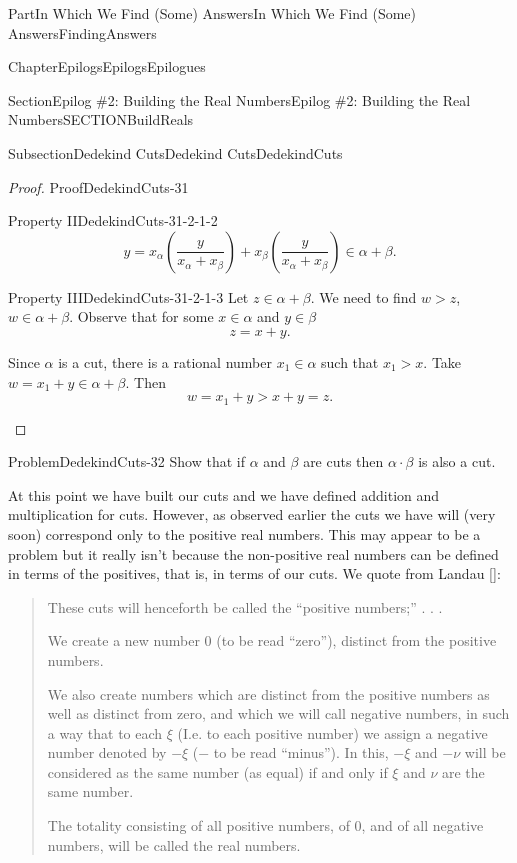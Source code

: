 \documentclass[oneside,10pt,]{book}
\newcommand{\xreffont}{\relax}
\numberwithin{equation}{part}
\begin{document}
\begin{partptx}{Part}{In Which We Find (Some) Answers}{}{In Which We Find (Some) Answers}{}{}{FindingAnswers}
\begin{chapterptx}{Chapter}{Epilogs}{}{Epilogs}{}{}{Epilogues}
\begin{sectionptx}{Section}{Epilog \#2: Building the Real Numbers}{}{Epilog \#2: Building the Real Numbers}{}{}{SECTIONBuildReals}
\begin{subsectionptx}{Subsection}{Dedekind Cuts}{}{Dedekind Cuts}{}{}{DedekindCuts}
\begin{proof}{Proof}{}{DedekindCuts-31}
\begin{descriptionlist}
\begin{dlimedium}{Property II}{DedekindCuts-31-2-1-2}
\begin{equation*}
y=x_\alpha\left(\frac{y}{x_\alpha+x_\beta}\right)+x_\beta\left(\frac{y}{x_\alpha+x_\beta}\right)\in\alpha+\beta\text{.}
\end{equation*}
%
\end{dlimedium}%
\begin{dlimedium}{Property III}{DedekindCuts-31-2-1-3}%
Let \(z\in\alpha+\beta\).  We need to find \(w>z\), \(w\in\alpha+\beta\).  Observe that for some \(x\in\alpha\) and \(y\in\beta\)%
\begin{equation*}
z=x+y\text{.}
\end{equation*}
%
\par
Since \(\alpha\) is a cut, there is a rational number \(x_1\in\alpha\) such that \(x_1>x\). Take \(w=x_1+y\in\alpha+\beta\).  Then%
\begin{equation*}
w=x_1+y>x+y=z\text{.}
\end{equation*}
%
\end{dlimedium}%
\end{descriptionlist}
%
\end{proof}
\begin{problem}{Problem}{}{DedekindCuts-32}%
Show that if \(\alpha\) and \(\beta\) are cuts then \(\alpha\cdot\beta\) is also a cut.%
\end{problem}
At this point we have built our cuts and we have defined addition and multiplication for cuts.  However, as observed earlier the cuts we have will (very soon) correspond only to the positive real numbers.  This may appear to be a problem but it really isn't because the non-positive real numbers can be defined in terms of the positives, that is, in terms of our cuts.  We quote from Landau \hyperlink{landau66__found_analy}{[{\xreffont 7}]}:%
\begin{quote}%
These cuts will henceforth be called the ``positive numbers;''  .  .  .%
\par
We create a new number \(0\) (to be read ``zero''), distinct from the positive numbers.%
\par
We also create numbers which are distinct from the positive numbers as well as distinct from zero, and which we will call negative numbers, in such a way that to each \(\xi\) (I.e. to each positive number) we assign a negative number denoted by \(-\xi\) (\(-\) to be read ``minus''). In this, \(-\xi\) and \(-\nu\) will be considered as the same number (as equal) if and only if \(\xi\) and \(\nu\) are the same number.%
\par
The totality consisting of all positive numbers, of \(0\), and of all negative numbers, will be called the real numbers.%

\end{quote}
\end{subsectionptx}
\end{sectionptx}
\end{chapterptx}
\end{partptx}
\end{document}
